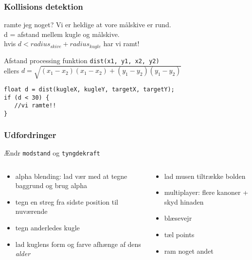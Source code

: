 \documentclass{beamer}
\begin{document}
\begin{frame}[fragile]
  \frametitle{Kollisions detektion}
  \begin{block}{ramte jeg noget?}
    Vi er heldige at vore målskive er rund.\\
    d = afstand mellem kugle og målskive. \\
    hvis $d < radius_{skive}+radius_{kugle}$ har vi ramt! 
  \end{block}
  \begin{block}{Afstand}
    processing funktion \texttt{dist(x1, y1, x2, y2)} \\
    ellers $d = \sqrt{ (x_1-x_2) (x_1-x_2) + (y_1-y_2)(y_1-y_2)}$
  \end{block}

\begin{verbatim} 
float d = dist(kugleX, kugleY, targetX, targetY);
if (d < 30) {
   //vi ramte!!
}  
\end{verbatim}

\end{frame}




\begin{frame}
  \frametitle{Udfordringer}

  Ændr \texttt{modstand} og \texttt{tyngdekraft}

  \begin{columns}
    \begin{column}{0.5\textwidth}
      \begin{itemize}
      \item alpha blending: lad vær med at tegne baggrund og brug alpha
      \item tegn en streg fra sidste position til nuværende
      \item tegn anderledes kugle
      \item lad kuglens form og farve afhænge af dens \emph{alder}
      \end{itemize}
    \end{column}
    \begin{column}{0.5\textwidth}
      \begin{itemize}
      \item lad musen tiltrække bolden
      \item multiplayer: flere kanoner + skyd hinaden
      \item blæsevejr
      \item tæl points
      \item ram noget andet
      \end{itemize}
    \end{column}
    
  \end{columns}

\end{frame}
\end{document}
